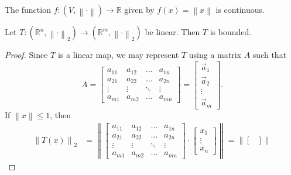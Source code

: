 \documentclass[notoc,notitlepage]{tufte-book}
\newcommand{\norm}[1]{\left\| #1 \right\|}
\begin{document}
\begin{lemma}\label{lemma:continuity_of_the_norm}
  The function $f : ( V, \norm\cdot ) \to \mathbb{R}$ given by $f(x) = \norm{x}$ is continuous.
\end{lemma}

\begin{propo}\label{propo:linear_map_between_spaces_of_different_dimensions_is_bounded}
  Let $T : (\mathbb{R}^n, \norm\cdot_2) \to (\mathbb{R}^m, \norm\cdot_2)$ be linear. Then $T$ is bounded.
\end{propo}

\begin{proof}
  Since $T$ is a linear map, we may represent $T$ using a matrix $A$ such that
  \begin{equation*}
    A = \begin{bmatrix}
      a_{11} & a_{12} & \hdots & a_{1n} \\
      a_{21} & a_{22} & \hdots & a_{2n} \\
      \vdots & \vdots & \ddots & \vdots \\
      a_{m1} & a_{m2} & \hdots & a_{mn}
    \end{bmatrix}
    = \begin{bmatrix}
      \vec{a}_1 \\
      \vec{a}_2 \\
      \vdots \\
      \vec{a}_m
    \end{bmatrix}.
  \end{equation*}
  If $\norm{x} \leq 1$, then
  \begin{align*}
    \norm{T(x)}_2 &= \norm{ \begin{bmatrix}
                          a_{11} & a_{12} & \hdots & a_{1n} \\
                          a_{21} & a_{22} & \hdots & a_{2n} \\
                          \vdots & \vdots & \ddots & \vdots \\
                          a_{m1} & a_{m2} & \hdots & a_{mn}
                      \end{bmatrix} \cdot \begin{bmatrix}
                          x_1 \\
                          \vdots \\
                          x_n
                      \end{bmatrix} }
                      = \norm{ \begin{bmatrix}

\end{bmatrix}}
\end{align*}
\end{proof}
\end{document}
